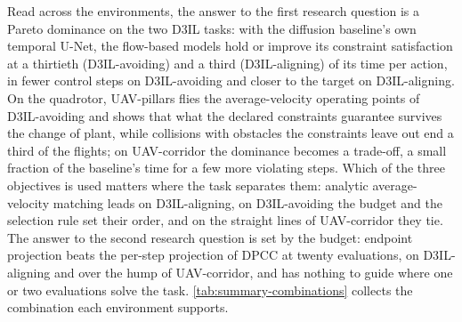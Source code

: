 Read across the environments, the answer to the first research question is a Pareto dominance on the two
D3IL tasks: with the diffusion baseline's own temporal U-Net, the flow-based models hold or improve its
constraint satisfaction at a thirtieth (D3IL-avoiding) and a third (D3IL-aligning) of its time per action, in
fewer control steps on D3IL-avoiding and closer to the target on D3IL-aligning. On the quadrotor, UAV-pillars
flies the average-velocity operating points of D3IL-avoiding and shows that what the declared constraints
guarantee survives the change of plant, while collisions with obstacles the constraints leave out end a third
of the flights; on UAV-corridor the dominance becomes a trade-off, a small fraction of the baseline's time for
a few more violating steps. Which of the three objectives is used matters where the task separates them:
analytic average-velocity matching leads on D3IL-aligning, on D3IL-avoiding the budget and the selection rule
set their order, and on the straight lines of UAV-corridor they tie. The answer to the second research
question is set by the budget: endpoint projection beats the per-step projection of \ac{DPCC} at twenty
evaluations, on D3IL-aligning and over the hump of UAV-corridor, and has nothing to guide where one or two
evaluations solve the task. \autoref{tab:summary-combinations} collects the combination each environment
supports.


